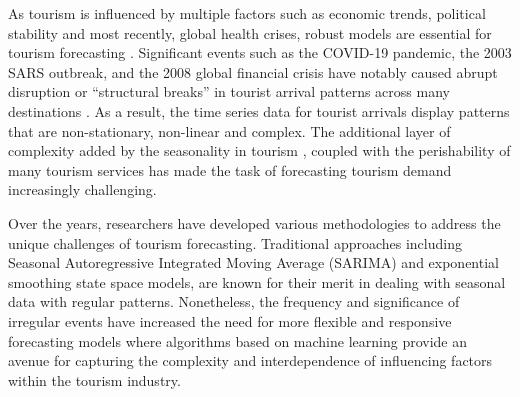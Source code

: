 \documentclass{article}
\begin{document}
As tourism is influenced by multiple factors such as economic trends, political stability and most recently, global health crises, robust models are essential for tourism forecasting \cite{song2019review}. Significant events such as the COVID-19 pandemic, the 2003 SARS outbreak, and the 2008 global financial crisis have notably caused abrupt disruption or ``structural breaks'' in tourist arrival patterns across many destinations \cite{fotiadis2021good, dombey2004effects, sheldon2010global}. As a result, the time series data for tourist arrivals display patterns that are non-stationary, non-linear and complex. The additional layer of complexity added by the seasonality in tourism \cite{hyndman2018forecasting}, coupled with the perishability of many tourism services has made the task of forecasting tourism demand increasingly challenging. 

Over the years, researchers have developed various methodologies to address the unique challenges of tourism forecasting. Traditional approaches including Seasonal Autoregressive Integrated Moving Average (SARIMA) and exponential smoothing state space models, are known for their merit in dealing with seasonal data with regular patterns. Nonetheless, the frequency and significance of irregular events have increased the need for more flexible and responsive forecasting models where algorithms based on machine learning provide an avenue for capturing the complexity and interdependence of influencing factors within the tourism industry. 

\end{document}
